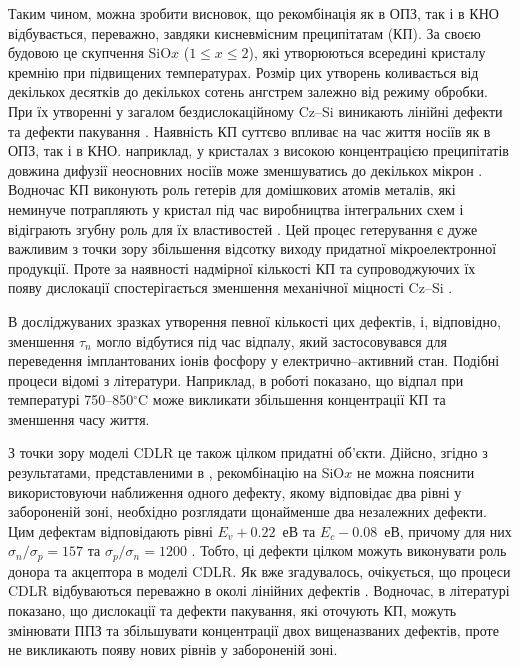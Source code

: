 Таким чином, можна зробити висновок, що рекомбінація як в ОПЗ, так і в КНО відбувається, переважно,
завдяки кисневмісним преципітатам (КП).
За своєю будовою  це скупчення SiO$x$ ($1\leq x\leq2$), які утворюються всередині кристалу кремнію при підвищених температурах.
Розмір цих утворень коливається від декількох десятків до декількох сотень ангстрем залежно від режиму обробки.
При їх утворенні у загалом бездислокаційному Cz--Si виникають лінійні дефекти та дефекти пакування \cite{SiO:Hwang,SiO:Vanhell}.
Наявність КП суттєво впливає на час життя носіїв як в ОПЗ, так і в КНО.
наприклад, у кристалах з високою концентрацією преципітатів довжина дифузії неосновних носіїв може зменшуватись до декількох мікрон \cite{SiO:Hwang}.
Водночас КП виконують роль гетерів для домішкових атомів металів, які неминуче потрапляють у кристал під час виробництва
інтегральних схем і відіграють згубну роль для їх властивостей \cite{APR:Oxigen,MSER74}.
Цей процес гетерування є дуже важливим з точки зору збільшення відсотку виходу придатної мікроелектронної продукції.
Проте за наявності надмірної кількості КП та супроводжуючих їх появу дислокації
спостерігається зменшення механічної міцності Cz--Si \cite{MSER74}.


В досліджуваних зразках утворення певної кількості цих дефектів, і, відповідно, зменшення $\tau _n$ могло відбутися під час відпалу,
який застосовувався для переведення імплантованих іонів фосфору у електрично--активний стан.
Подібні процеси відомі з літератури.
Наприклад, в роботі \cite{SiO:Miyagi} показано, що відпал при температурі 750--850$^\circ$C
може викликати збільшення концентрації КП та зменшення часу життя.

З точки зору моделі CDLR це також цілком придатні об'єкти.
Дійсно, згідно з результатами, представленими в \cite{MurphySC2014,MurphyJAP2012},
рекомбінацію на SiO$x$ не можна пояснити використовуючи наближення одного дефекту, якому відповідає два рівні у забороненій зоні,
необхідно розглядати щонайменше два незалежних дефекти.
Цим дефектам відповідають рівні $E_v+0.22$~еВ та $E_c-0.08$~еВ, причому для них $\sigma_n/\sigma_p=157$ та $\sigma_p/\sigma_n=1200$ \cite{MurphyJAP2012}.
Тобто, ці дефекти цілком можуть виконувати роль донора та акцептора в моделі CDLR.
Як вже згадувалось, очікується, що процеси CDLR відбуваються переважно в околі лінійних дефектів \cite{CDLR:JAP,CDLR:SSP}.
Водночас, в літературі \cite{MurphySC2014,MurphyJAP2011,MurphyJAP2012} показано, що дислокації та дефекти пакування,
які оточують КП, можуть змінювати ППЗ та збільшувати концентрації двох вищеназваних дефектів,
проте не викликають появу  нових рівнів у забороненій зоні.

